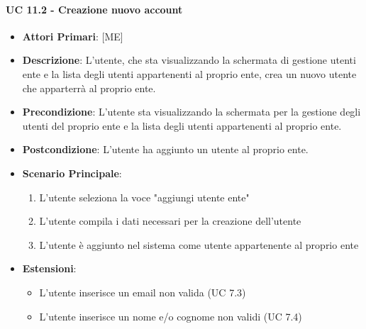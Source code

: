 			\paragraph{UC 11.2 - Creazione nuovo account}
			\begin{itemize}
				\item \textbf{Attori Primari}: [ME]
				\item \textbf{Descrizione}: L'utente, che sta visualizzando la schermata di gestione utenti ente e la lista degli utenti appartenenti al proprio ente, crea un nuovo utente che apparterrà al proprio ente.
				\item \textbf{Precondizione}: L'utente sta visualizzando la schermata per la gestione degli utenti del proprio ente e la lista degli utenti appartenenti al proprio ente.
				\item \textbf{Postcondizione}: L'utente ha aggiunto un utente al proprio ente.
				\item \textbf{Scenario Principale}:
				\begin{enumerate}
					\item{L'utente seleziona la voce "aggiungi utente ente"}
					\item{L'utente compila i dati necessari per la creazione dell'utente}
					\item{L'utente è aggiunto nel sistema come utente appartenente al proprio ente}
				\end{enumerate}	
				\item \textbf{Estensioni}:
				\begin{itemize}
					\item L'utente inserisce un email non valida (UC 7.3)
					\item L'utente inserisce un nome e/o cognome non validi (UC 7.4)
				\end{itemize}
			\end{itemize}
			
